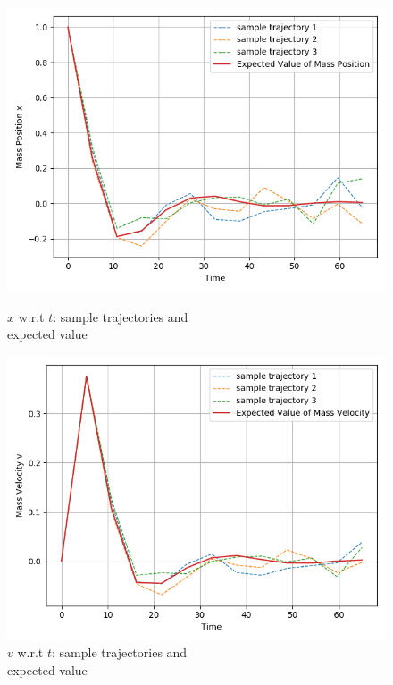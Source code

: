 \documentclass{article}
\begin{document}
\begin{figure}[h!]
	\centering
	\begin{minipage}[t]{.27\paperwidth}
		\centering
		\includegraphics[width=1.0\textwidth]{Figures/x_t.png}
		\caption{$x$ w.r.t $t$: sample trajectories and \\ expected value \label{fig:x_t}}
	\end{minipage}%
	\begin{minipage}[t]{.27\paperwidth}
		\centering
		\includegraphics[width=1.0\textwidth]{Figures/v_t.png}
		\caption{$v$ w.r.t $t$: sample trajectories and \\ expected value \label{fig:v_t}}
	\end{minipage}
\end{figure}
\end{document}
